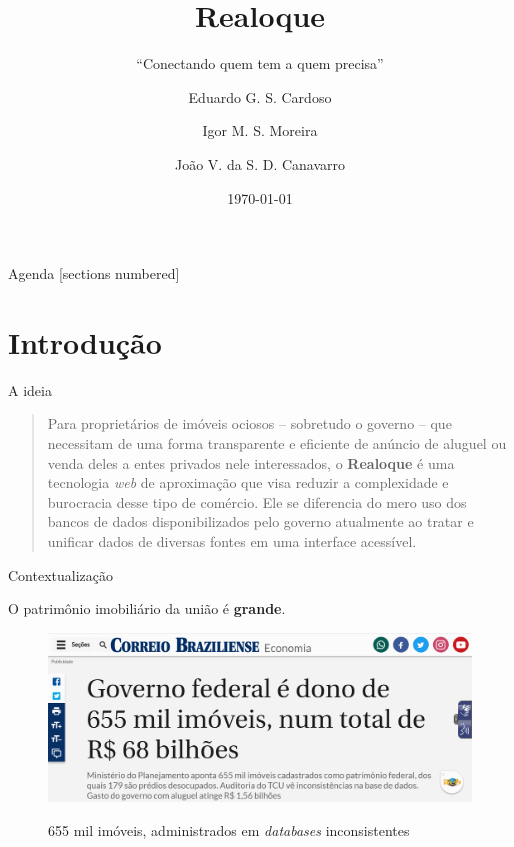 \documentclass[10pt]{beamer}
\title{Realoque}
\subtitle{``Conectando quem tem a quem precisa''}
\date{\today}
\author{Eduardo G. S. Cardoso \and Igor M. S. Moreira \and João V. da S. D. Canavarro}
\institute{Hackaton SERPRO}
\begin{document}
\maketitle

\begin{frame}{Agenda}
  [sections numbered]
  \tableofcontents[]
\end{frame}

\section{Introdução}

\begin{frame}[fragile]{A ideia}

    \begin{quote}
        Para proprietários de imóveis ociosos -- sobretudo o governo -- que necessitam de uma forma transparente e eficiente de anúncio de aluguel ou venda deles a entes privados nele interessados, o \textbf{Realoque} é uma tecnologia \textit{web} de aproximação que visa reduzir a complexidade  e burocracia desse tipo de comércio. Ele se diferencia do mero uso dos bancos de dados disponibilizados pelo governo atualmente ao tratar e unificar dados de diversas fontes em uma interface acessível.
    \end{quote}
    
\end{frame}

\begin{frame}[fragile]{Contextualização}

    O patrimônio imobiliário da união é \textbf{grande}.
    
    \begin{figure}
        \centering
        \caption{655 mil imóveis, administrados em \textit{databases} inconsistentes}
        \includegraphics[width=\linewidth]{demo/images/noticia11_multiply.png}
        \label{fig:noticia1}
    \end{figure}
    
\end{frame}
\end{document}
